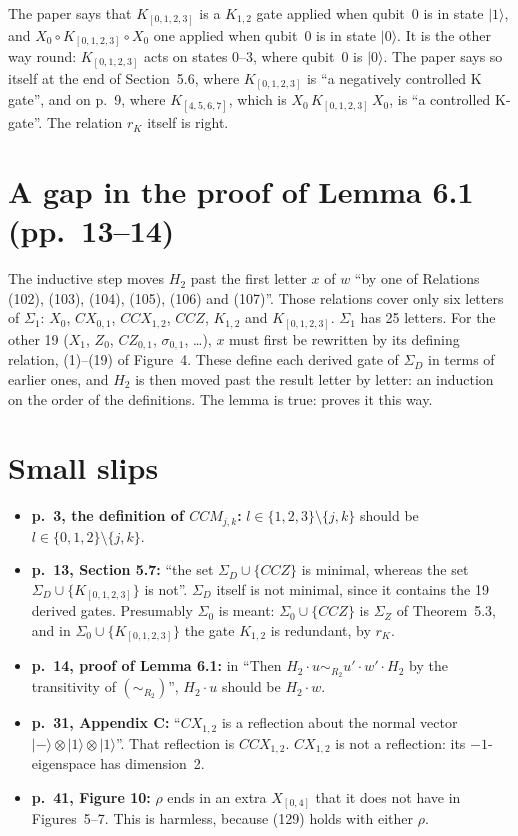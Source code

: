 \documentclass[11pt]{article}
\newcommand{\ket}[1]{|#1\rangle}
\newcommand{\Xa}[1]{X_{[#1]}}
\newcommand{\Ka}[1]{K_{[#1]}}
\newcommand{\CX}{\mathit{CX}}
\newcommand{\CZ}{\mathit{CZ}}
\newcommand{\CCX}{\mathit{CCX}}
\newcommand{\CCZ}{\mathit{CCZ}}
\newcommand{\rK}{r_K}
\newcommand{\file}[1]{\path{#1}}
\begin{document}
The paper says that $\Ka{0,1,2,3}$ is a $K_{1,2}$ gate applied when qubit~0
is in state $\ket1$, and $X_0\circ\Ka{0,1,2,3}\circ X_0$ one applied when
qubit~0 is in state $\ket0$. It is the other way round: $\Ka{0,1,2,3}$ acts
on states 0--3, where qubit~0 is $\ket0$. The paper says so itself at the
end of Section~5.6, where $\Ka{0,1,2,3}$ is ``a negatively controlled K
gate'', and on p.~9, where $\Ka{4,5,6,7}$, which is
$X_0\,\Ka{0,1,2,3}\,X_0$, is ``a controlled K-gate''. The relation $\rK$
itself is right.

\section{A gap in the proof of Lemma 6.1 (pp.~13--14)}

The inductive step moves $H_2$ past the first letter $x$ of $w$ ``by one of
Relations (102), (103), (104), (105), (106) and (107)''. Those relations
cover only six letters of $\Sigma_1$: $X_0$, $\CX_{0,1}$, $\CCX_{1,2}$,
$\CCZ$, $K_{1,2}$ and $\Ka{0,1,2,3}$. $\Sigma_1$ has 25 letters. For the
other 19 ($X_1$, $Z_0$, $\CZ_{0,1}$, $\sigma_{0,1}$, \dots), $x$ must first be
rewritten by its defining relation, (1)--(19) of Figure~4. These define each
derived gate of $\Sigma_D$ in terms of earlier ones, and $H_2$ is then moved
past the result letter by letter: an induction on the order of the
definitions. The lemma is true: \file{Push.agda} proves it this way.

\section{Small slips}

\begin{itemize}
\item \textbf{p.~3, the definition of $CCM_{j,k}$:}
  $l\in\{1,2,3\}\setminus\{j,k\}$ should be
  $l\in\{0,1,2\}\setminus\{j,k\}$.
\item \textbf{p.~13, Section 5.7:} ``the set $\Sigma_D\cup\{\CCZ\}$ is
  minimal, whereas the set $\Sigma_D\cup\{\Ka{0,1,2,3}\}$ is not''.
  $\Sigma_D$ itself is not minimal, since it contains the 19 derived gates.
  Presumably $\Sigma_0$ is meant: $\Sigma_0\cup\{\CCZ\}$ is $\Sigma_Z$ of
  Theorem~5.3, and in $\Sigma_0\cup\{\Ka{0,1,2,3}\}$ the gate $K_{1,2}$ is
  redundant, by $\rK$.
\item \textbf{p.~14, proof of Lemma 6.1:} in ``Then
  $H_2\cdot u\sim_{R_2}u'\cdot w'\cdot H_2$ by the transitivity of
  $(\sim_{R_2})$'', $H_2\cdot u$ should be $H_2\cdot w$.
\item \textbf{p.~31, Appendix C:} ``$\CX_{1,2}$ is a reflection about the
  normal vector $\ket{-}\otimes\ket1\otimes\ket1$''. That reflection is
  $\CCX_{1,2}$. $\CX_{1,2}$ is not a reflection: its $-1$-eigenspace has
  dimension~2.
\item \textbf{p.~41, Figure 10:} $\rho$ ends in an extra $\Xa{0,4}$ that
  it does not have in Figures~5--7. This is harmless, because (129) holds
  with either $\rho$.
\end{itemize}
\end{document}
